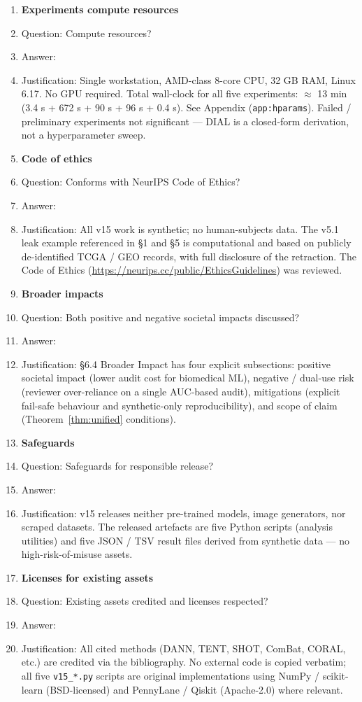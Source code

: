 \begin{enumerate}
\item {\bf Experiments compute resources}
    \item[] Question: Compute resources?
    \item[] Answer: \answerYes{}
    \item[] Justification: Single workstation, AMD-class 8-core CPU, 32 GB RAM, Linux 6.17. No GPU required. Total wall-clock for all five experiments: $\approx$ 13 min (3.4 s + 672 s + 90 s + 96 s + 0.4 s). See Appendix (\texttt{app:hparams}). Failed / preliminary experiments not significant — DIAL is a closed-form derivation, not a hyperparameter sweep.

\item {\bf Code of ethics}
    \item[] Question: Conforms with NeurIPS Code of Ethics?
    \item[] Answer: \answerYes{}
    \item[] Justification: All v15 work is synthetic; no human-subjects data. The v5.1 leak example referenced in §1 and §5 is computational and based on publicly de-identified TCGA / GEO records, with full disclosure of the retraction. The Code of Ethics (\url{https://neurips.cc/public/EthicsGuidelines}) was reviewed.

\item {\bf Broader impacts}
    \item[] Question: Both positive and negative societal impacts discussed?
    \item[] Answer: \answerYes{}
    \item[] Justification: §6.4 Broader Impact has four explicit subsections: positive societal impact (lower audit cost for biomedical ML), negative / dual-use risk (reviewer over-reliance on a single AUC-based audit), mitigations (explicit fail-safe behaviour and synthetic-only reproducibility), and scope of claim (Theorem~\ref{thm:unified} conditions).

\item {\bf Safeguards}
    \item[] Question: Safeguards for responsible release?
    \item[] Answer: \answerNA{}
    \item[] Justification: v15 releases neither pre-trained models, image generators, nor scraped datasets. The released artefacts are five Python scripts (analysis utilities) and five JSON / TSV result files derived from synthetic data — no high-risk-of-misuse assets.

\item {\bf Licenses for existing assets}
    \item[] Question: Existing assets credited and licenses respected?
    \item[] Answer: \answerYes{}
    \item[] Justification: All cited methods (DANN, TENT, SHOT, ComBat, CORAL, etc.) are credited via the bibliography. No external code is copied verbatim; all five \texttt{v15\_*.py} scripts are original implementations using NumPy / scikit-learn (BSD-licensed) and PennyLane / Qiskit (Apache-2.0) where relevant.


\end{enumerate}

